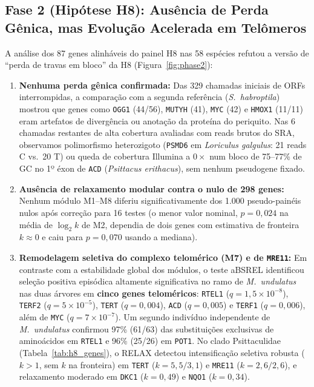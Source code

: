 \documentclass[10pt,a4paper,twocolumn]{article}
\begin{document}
\subsection{Fase 2 (Hipótese H8): Ausência de Perda Gênica, mas Evolução Acelerada em Telômeros}
A análise dos 87 genes alinháveis do painel H8 nas 58 espécies refutou a versão de ``perda de travas em bloco'' da H8 (Figura~\ref{fig:phase2}):
\begin{enumerate}
    \item \textbf{Nenhuma perda gênica confirmada:} Das 329 chamadas iniciais de ORFs interrompidas, a comparação com a segunda referência (\textit{S.\ habroptila}) mostrou que genes como \texttt{OGG1} (44/56), \texttt{MUTYH} (41), \texttt{MYC} (42) e \texttt{HMOX1} (11/11) eram artefatos de divergência ou anotação da proteína do periquito. Nas 6 chamadas restantes de alta cobertura avaliadas com reads brutos do SRA, observamos polimorfismo heterozigoto (\texttt{PSMD6} em \textit{Loriculus galgulus}: 21 reads C vs.\ 20 T) ou queda de cobertura Illumina a $0\times$ num bloco de 75--77\% de GC no 1º éxon de \texttt{ACD} (\textit{Psittacus erithacus}), sem nenhum pseudogene fixado.
    \item \textbf{Ausência de relaxamento modular contra o nulo de 298 genes:} Nenhum módulo M1--M8 diferiu significativamente dos 1.000 pseudo-painéis nulos após correção para 16 testes (o menor valor nominal, $p = 0,024$ na média de $\log_2 k$ de M2, dependia de dois genes com estimativa de fronteira $k \approx 0$ e caiu para $p = 0,070$ usando a mediana).
    \item \textbf{Remodelagem seletiva do complexo telomérico (M7) e de \texttt{MRE11}:} Em contraste com a estabilidade global dos módulos, o teste aBSREL identificou seleção positiva episódica altamente significativa no ramo de \textit{M.\ undulatus} nas duas árvores em \textbf{cinco genes teloméricos}: \texttt{RTEL1} ($q = 1,5 \times 10^{-8}$), \texttt{TERF2} ($q = 5 \times 10^{-5}$), \texttt{TERT} ($q = 0,004$), \texttt{ACD} ($q = 0,005$) e \texttt{TERF1} ($q = 0,006$), além de \texttt{MYC} ($q = 7 \times 10^{-7}$). Um segundo indivíduo independente de \textit{M.\ undulatus} confirmou 97\% (61/63) das substituições exclusivas de aminoácidos em \texttt{RTEL1} e 96\% (25/26) em \texttt{POT1}. No clado Psittaculidae (Tabela~\ref{tab:h8_genes}), o RELAX detectou intensificação seletiva robusta ($k > 1$, sem $k$ na fronteira) em \texttt{TERT} ($k = 5,5 / 3,1$) e \texttt{MRE11} ($k = 2,6 / 2,6$), e relaxamento moderado em \texttt{DKC1} ($k = 0,49$) e \texttt{NQO1} ($k = 0,34$).
\end{enumerate}
\end{document}

